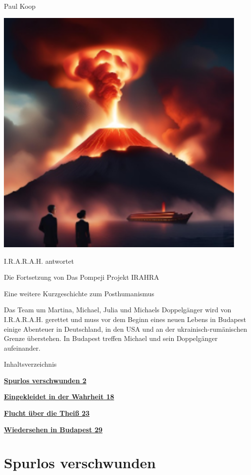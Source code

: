 \documentclass[
]{article}
\author{}
\date{}
\begin{document}
Paul Koop

\includegraphics[width=4.92849in,height=4.92031in]{media/image6.png}

I.R.A.R.A.H. antwortet

Die Fortsetzung von Das Pompeji Projekt IRAHRA

Eine weitere Kurzgeschichte zum Posthumanismus

Das Team um Martina, Michael, Julia und Michaels Doppelgänger wird von
I.R.A.R.A.H. gerettet und muss vor dem Beginn eines neuen Lebens in
Budapest einige Abenteuer in Deutschland, in den USA und an der
ukrainisch-rumänischen Grenze überstehen. In Budapest treffen Michael
und sein Doppelgänger aufeinander.

Inhaltsverzeichnis

\hyperref[spurlos-verschwunden]{\textbf{Spurlos verschwunden 2}}

\hyperref[eingekleidet-in-der-wahrheit]{\textbf{Eingekleidet in der
Wahrheit 18}}

\hyperref[flucht-uxfcber-die-theiuxdf]{\textbf{Flucht über die Theiß
23}}

\hyperref[wiedersehen-in-budapest]{\textbf{Wiedersehen in Budapest 29}}

\section{Spurlos verschwunden}\label{spurlos-verschwunden}
\end{document}
